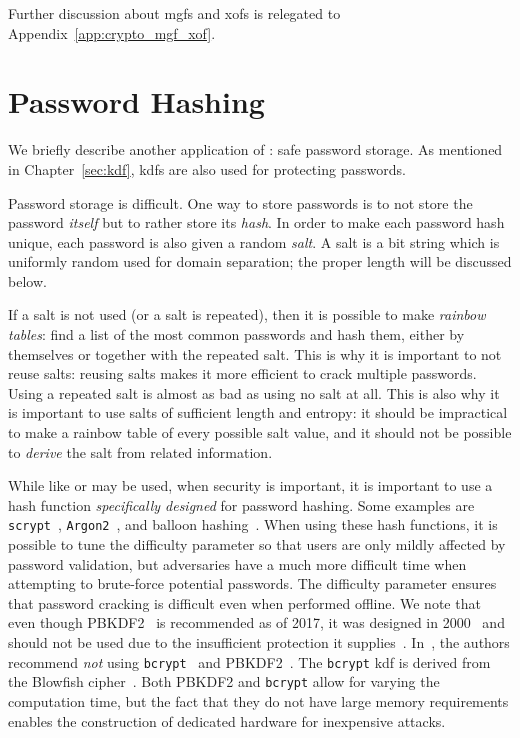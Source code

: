 Further discussion about \glspl{mgf} and \glspl{xof} is relegated to
Appendix~\ref{app:crypto_mgf_xof}.



\section{Password Hashing}
\label{sec:hash_apps_password_hashing}

We briefly describe another application of :
safe password storage.
As mentioned in Chapter~\ref{sec:kdf}, \glspl{kdf}
are also used for protecting passwords.

Password storage is difficult.
One way to store passwords is to not store the password \emph{itself}
but to rather store its \emph{hash}.
In order to make each password hash unique, each password
is also given a random \emph{\gls{salt}}.
A \gls{salt} is a bit string which is uniformly random used
for domain separation;
the proper length will be discussed below.

If a \gls{salt} is not used (or a \gls{salt} is repeated),
then it is possible to make \emph{rainbow tables}:
find a list of the most common passwords and hash them,
either by themselves or together with the repeated \gls{salt}.
This is why it is important to not reuse \glspl{salt}:
reusing \glspl{salt} makes it more efficient to crack multiple passwords.
Using a repeated \gls{salt} is almost as bad as
using no \gls{salt} at all.
This is also why it is important to use \glspl{salt}
of sufficient length and entropy:
it should be impractical to make a rainbow table
of every possible \gls{salt} value,
and it should not be possible to \emph{derive} the \gls{salt}
from related information.

While  like \ShaTwo{} or \ShaThree{} may be used,
when security is important, it is important to use a \gls{hash function}
\emph{specifically designed} for password hashing.
Some examples are \texttt{scrypt}~\cite{scryptPaper,rfc7914},
\texttt{Argon2}~\cite{argon2},
and balloon hashing~\cite{cryptoeprint:2016:027}.
When using these \glspl{hash function}, it is possible to tune
the difficulty parameter so that users are only mildly affected
by password validation,
but adversaries have a much more difficult time
when attempting to brute-force potential passwords.
The difficulty parameter ensures that password cracking is difficult
even when performed offline.
We note that even though PBKDF2~\cite{rfc8018} is recommended
as of 2017, it was designed in 2000~\cite{rfc2898}
and should not be used due to the insufficient protection
it supplies~\cite{blocki2018economics}.
In~\cite{blocki2018economics}, the authors recommend \emph{not}
using \texttt{bcrypt}~\cite{bcryptPaper}
and PBKDF2~\cite{rfc2898}.
The \texttt{bcrypt} \gls{kdf}
is derived from the Blowfish cipher~\cite{BlowfishAlg}.
Both PBKDF2 and \texttt{bcrypt} allow for varying the computation time,
but the fact that they do not have large memory requirements
enables the construction of dedicated hardware
for inexpensive attacks.


